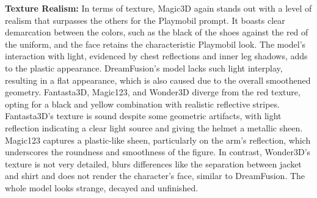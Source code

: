 \textbf{Texture Realism:} In terms of texture, Magic3D again stands out with a level of realism that surpasses the others for the Playmobil prompt. It boasts clear demarcation between the colors, such as the black of the shoes against the red of the uniform, and the face retains the characteristic Playmobil look. The model's interaction with light, evidenced by chest reflections and inner leg shadows, adds to the plastic appearance. DreamFusion's model lacks such light interplay, resulting in a flat appearance, which is also caused due to the overall smoothened geometry. Fantasta3D, Magic123, and Wonder3D diverge from the red texture, opting for a black and yellow combination with realistic reflective stripes. Fantasta3D's texture is sound despite some geometric artifacts, with light reflection indicating a clear light source and giving the helmet a metallic sheen. Magic123 captures a plastic-like sheen, particularly on the arm's reflection, which underscores the roundness and smoothness of the figure. In contrast, Wonder3D's texture is not very detailed, blurs differences like the separation between jacket and shirt and does not render the character's face, similar to DreamFusion. The whole model looks strange, decayed and unfinished.

